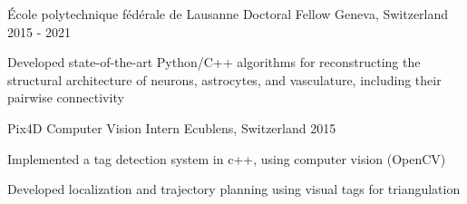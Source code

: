 \begin{cventries}


\cventry
{École polytechnique fédérale de Lausanne}
{Doctoral Fellow}
{Geneva, Switzerland}
{2015 - 2021}
{
\begin{cvitems}
\item{Developed state-of-the-art Python/C++ algorithms for reconstructing the structural architecture of neurons, astrocytes, and vasculature, including their pairwise connectivity}
\end{cvitems}
}



\cventry
{Pix4D} %
{Computer Vision Intern} %
{Ecublens, Switzerland} %
{2015 } %
{ %
\begin{cvitems}
\item {Implemented a tag detection system in c++, using computer vision (OpenCV)}
\item {Developed localization and trajectory planning using visual tags for triangulation}
\end{cvitems}
}


\end{cventries}
